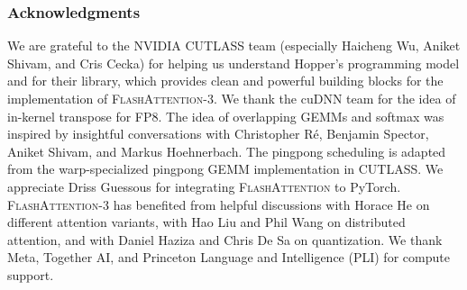 \subsubsection*{Acknowledgments}

We are grateful to the NVIDIA CUTLASS team (especially Haicheng Wu, Aniket Shivam, and Cris Cecka) for helping us understand Hopper's programming model and for their library, which provides clean and powerful building blocks for the implementation of \textsc{FlashAttention-3}.
We thank the cuDNN team for the idea of in-kernel transpose for FP8. The idea of overlapping GEMMs and softmax was inspired by insightful conversations with Christopher R{\'e}, Benjamin Spector, Aniket Shivam, and Markus Hoehnerbach. The pingpong scheduling is adapted from the warp-specialized pingpong GEMM implementation in CUTLASS. We appreciate Driss Guessous for integrating \textsc{FlashAttention} to PyTorch.
\textsc{FlashAttention-3} has benefited from helpful discussions with Horace He on different attention variants, with Hao Liu and Phil Wang on distributed attention, and with Daniel Haziza and Chris De Sa on quantization. We thank Meta, Together AI, and Princeton Language and Intelligence (PLI) for compute support.

